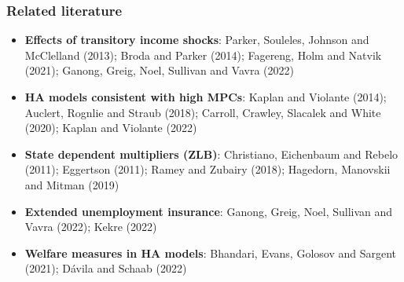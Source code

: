\documentclass[pdflatex,aspectratio=169]{beamer}
\begin{document}
\begin{frame}
  \frametitle{Related literature}
  \small
  \begin{itemize}[<+->]
  \item \textbf{Effects of transitory income shocks}: 
    Parker, Souleles, Johnson and McClelland (2013); Broda and Parker (2014); Fagereng, Holm and Natvik (2021); Ganong, Greig, Noel, Sullivan and Vavra (2022)
  \item \textbf{HA models consistent with high MPCs}: 
    Kaplan and Violante (2014); Auclert, Rognlie and Straub (2018); Carroll, Crawley, Slacalek and White (2020); Kaplan and Violante (2022) 
  \item \textbf{State dependent multipliers (ZLB)}: 
    Christiano, Eichenbaum and Rebelo (2011); Eggertson (2011); Ramey and Zubairy (2018); Hagedorn, Manovskii and Mitman (2019) 
  \item \textbf{Extended unemployment insurance}:
    Ganong, Greig, Noel, Sullivan and Vavra (2022); Kekre (2022) 
  \item \textbf{Welfare measures in HA models}:
    Bhandari, Evans, Golosov and Sargent (2021); D{\'a}vila and Schaab (2022)
  \end{itemize}
  \normalsize
\end{frame}
\end{document}
